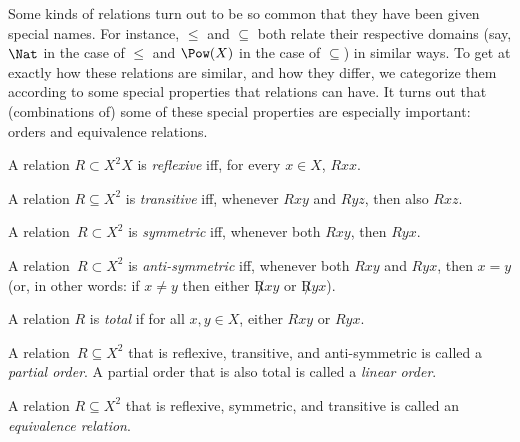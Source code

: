 \documentclass[../../include/open-logic-section]{subfiles}
\begin{document}

\begin{intro}
Some kinds of relations turn out to be so common that they have been
given special names.  For instance, $\le$ and $\subseteq$ both relate
their respective domains (say, $\Nat$ in the case of $\le$ and
$\Pow(X)$ in the case of $\subseteq$) in similar ways.  To get at
exactly how these relations are similar, and how they differ, we
categorize them according to some special properties that relations
can have.  It turns out that (combinations of) some of these special
properties are especially important: orders and equivalence relations.
\end{intro}

\begin{defn}
A relation $R \subset X^2X$ is \emph{reflexive} iff, for every $x \in
X$, $Rxx$.
\end{defn}

\begin{defn}
A relation $R \subseteq X^2$ is \emph{transitive} iff, whenever $Rxy$
and $Ryz$, then also $Rxz$.
\end{defn}

\begin{defn}
A relation~$R \subset X^2$ is \emph{symmetric} iff, whenever both
$Rxy$, then $Ryx$.
\end{defn}

\begin{defn}
A relation~$R \subset X^2$ is \emph{anti-symmetric} iff, whenever both
$Rxy$ and $Ryx$, then $x=y$ (or, in other words: if $x\neq y$ then
either $\not Rxy$ or $\not Ryx$).
\end{defn}

\begin{defn}
A relation $R$ is \emph{total} if for all $x,y\in X$,
either $Rxy$ or $Ryx$.
\end{defn}

\begin{defn}
A relation~$R \subseteq X^2$ that is reflexive, transitive, and
anti-symmetric is called a \emph{partial order}.  A partial order that
is also total is called a \emph{linear order}.
\end{defn}

\begin{defn}
A relation $R \subseteq X^2$ that is reflexive, symmetric, and
transitive is called an \emph{equivalence relation}.
\end{defn}
\end{document}
